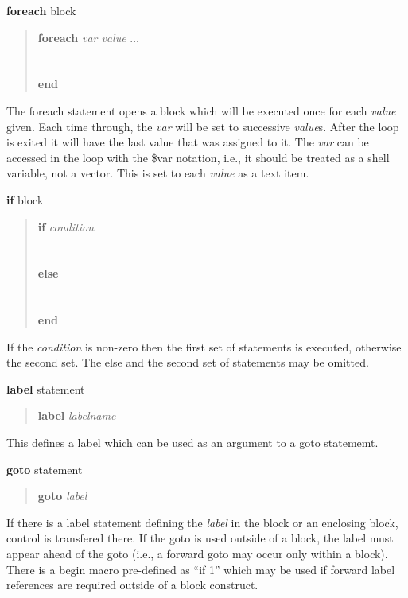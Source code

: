 \begin{description}
\item{{\bf foreach} block}\\

\begin{quote}
{\bf\vt foreach} {\it var value\/} ...\\
\\
\\
{\bf\vt end}
\end{quote}
The {\et foreach} statement opens a block which will be executed once
for each {\it value} given.  Each time through, the {\it var} will be
set to successive {\it value\/}s.  After the loop is exited it will
have the last value that was assigned to it.  The {\it var} can be
accessed in the loop with the {\vt \$var} notation, i.e., it should be
treated as a shell variable, not a vector.  This is set to each {\it
value} as a text item.

\item{{\bf if} block}\\

\begin{quote}
{\bf\vt if} {\it condition}\\
\\
\\
{\bf\vt else}\\
\\
\\
{\bf\vt end}
\end{quote}
If the {\it condition\/} is non-zero then the first set of statements is
executed, otherwise the second set.  The {\et else} and the second set of
statements may be omitted.

\item{{\bf label} statement}\\

\begin{quote}
{\bf\vt label} {\it labelname}
\end{quote}
This defines a label which can be used as an argument to a {\et goto}
statememt.

\item{{\bf goto} statement}\\

\begin{quote}
{\bf\vt goto} {\it label}
\end{quote}
If there is a {\et label} statement defining the {\it label} in the
block or an enclosing block, control is transfered there.  If the {\et
goto} is used outside of a block, the label must appear ahead of the
{\et goto} (i.e., a forward {\et goto} may occur only within a block). 
There is a {\et begin} macro pre-defined as ``{\vt if 1}'' which may
be used if forward label references are required outside of a block
construct.


\end{description}
